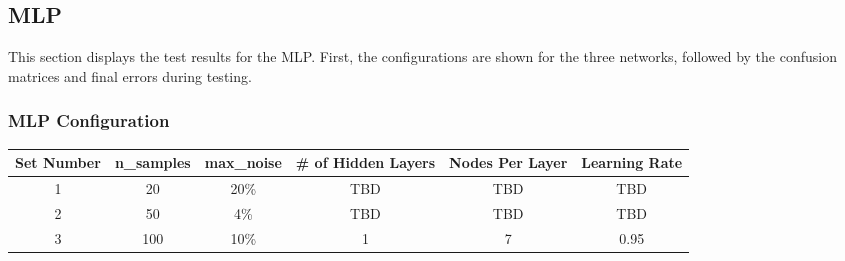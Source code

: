 \documentclass{article}
\begin{document}
		\subsection{MLP}
			This section displays the test results for the MLP. First, the configurations are shown for the three networks, followed by the confusion matrices and final errors during testing.
		
			\subsubsection{MLP Configuration}
				\begin{minipage}{\linewidth}
					\centering
					\begin{tabular}{c|cc|ccc}\label{ResVary}
						Set Number 	&	n\_samples	& max\_noise & \# of Hidden Layers 	& Nodes Per Layer 	& Learning Rate \\
						\hline
						1			&	20 			&	20\%	 &  TBD 			 	&	TBD				& TBD \\
						2			&	50			&	4\%		 &  TBD				 	&	TBD				& TBD \\
						3			&	100			&	10\%	 &  1 			 		&	7				& 0.95 \\
					\end{tabular}
				\end{minipage}
			
\end{document}
